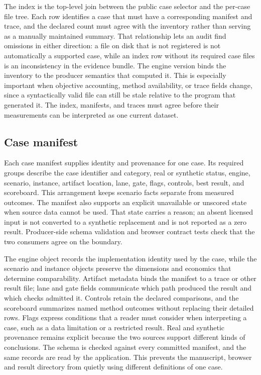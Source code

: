 The index is the top-level join between the public case selector and the per-case file tree. Each row identifies a case that must have a corresponding manifest and trace, and the declared count must agree with the inventory rather than serving as a manually maintained summary. That relationship lets an audit find omissions in either direction: a file on disk that is not registered is not automatically a supported case, while an index row without its required case files is an inconsistency in the evidence bundle. The engine version binds the inventory to the producer semantics that computed it. This is especially important when objective accounting, method availability, or trace fields change, since a syntactically valid file can still be stale relative to the program that generated it. The index, manifests, and traces must agree before their measurements can be interpreted as one current dataset.

\subsection{Case manifest}
\label{sec:data-case-manifest}
Each case manifest supplies identity and provenance for one case. Its required groups describe the case identifier and category, real or synthetic status, engine, scenario, instance, artifact location, lane, gate, flags, controls, best result, and scoreboard. This arrangement keeps scenario facts separate from measured outcomes. The manifest also supports an explicit unavailable or unscored state when source data cannot be used. That state carries a reason; an absent licensed input is not converted to a synthetic replacement and is not reported as a zero result. Producer-side schema validation and browser contract tests check that the two consumers agree on the boundary.

The engine object records the implementation identity used by the case, while the scenario and instance objects preserve the dimensions and economics that determine comparability. Artifact metadata binds the manifest to a trace or other result file; lane and gate fields communicate which path produced the result and which checks admitted it. Controls retain the declared comparisons, and the scoreboard summarizes named method outcomes without replacing their detailed rows. Flags express conditions that a reader must consider when interpreting a case, such as a data limitation or a restricted result. Real and synthetic provenance remains explicit because the two sources support different kinds of conclusions. The schema is checked against every committed manifest, and the same records are read by the application. This prevents the manuscript, browser and result directory from quietly using different definitions of one case.

